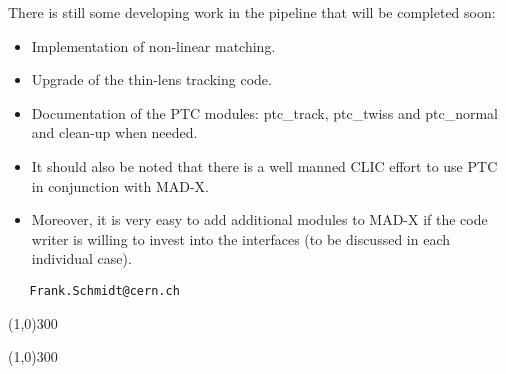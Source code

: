  There is still some developing work in the pipeline that will be completed soon: 
\begin{itemize}
	\item Implementation of non-linear matching.
	\item Upgrade of the thin-lens tracking code.
	\item Documentation of the PTC modules: ptc\_track, ptc\_twiss and ptc\_normal and clean-up when needed.
	\item It should also be noted that there is a well manned CLIC effort to use PTC in conjunction with MAD-X.
	\item Moreover, it is very easy to add additional modules to MAD-X if the code writer is willing to invest into the interfaces (to be discussed in each individual case).
\end{itemize}
\begin{verbatim}
   Frank.Schmidt@cern.ch
\end{verbatim}

\line(1,0){300}


\line(1,0){300}


